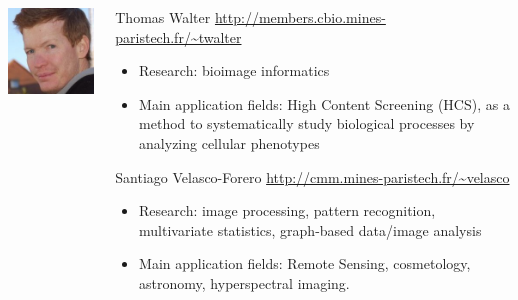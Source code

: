 \documentclass[xcolor=pdftex,dvipsnames,table,mathserif]{beamer}
\begin{document}
{\begin{columns}
\begin{column}{.2\textwidth}
\vspace{2em}
    \includegraphics[width=\textwidth]{ed.jpg}

  \end{column}
  \begin{column}{.8\textwidth}

    \begin{block}{Thomas Walter \hfill \scriptsize{\url{http://members.cbio.mines-paristech.fr/\~twalter}}}
      \scriptsize{
    \begin{itemize}
    \item Research: bioimage informatics
    \item Main application fields: High Content Screening (HCS), as a method to systematically study biological processes by analyzing cellular phenotypes
    \end{itemize}
    }
  \end{block}

  \begin{block}{Santiago Velasco-Forero  \hfill \scriptsize{\url{http://cmm.mines-paristech.fr/\~velasco}}}
      \scriptsize{
    \begin{itemize}
    \item Research: image processing, pattern recognition, multivariate statistics, graph-based data/image analysis
    \item Main application fields: Remote Sensing, cosmetology, astronomy, hyperspectral imaging.
    \end{itemize}
    }
  \end{block}


\end{column}
\end{columns}}
\end{document}
